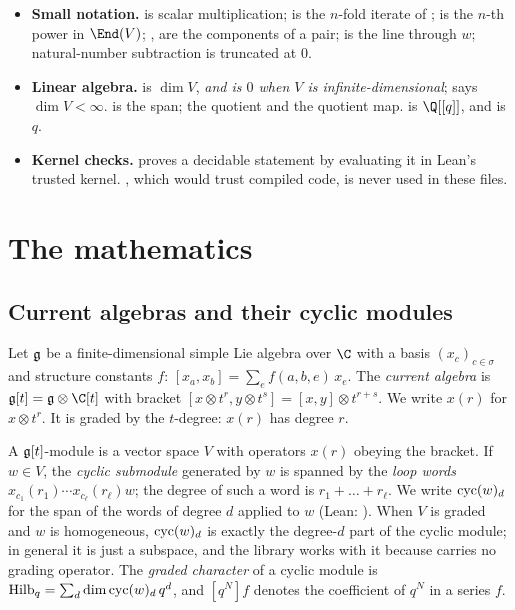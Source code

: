 \begin{itemize}
  $=\{0,\dots,n-1\}$;  $=\{(i,j):i+j=n\}$.
\item \textbf{Small notation.}  is scalar multiplication;  is the $n$-fold iterate of ;
   is the $n$-th power in $\End(V)$; ,  are the components of a pair;  is
  the line through $w$; natural-number subtraction is truncated at $0$.
\item \textbf{Linear algebra.}  is $\dim V$, \emph{and is $0$ when $V$ is infinite-dimensional};
   says $\dim V<\infty$.  is the span;  the quotient and
   the quotient map.  is $\Q[[q]]$, and  is $q$.
\item \textbf{Kernel checks.}  proves a decidable statement by evaluating it in Lean's trusted kernel.
  , which would trust compiled code, is never used in these files.
\end{itemize}

\section{The mathematics}\label{l26:sec:math}

\subsection{Current algebras and their cyclic modules}\label{l26:sec:current}

Let $\mathfrak g$ be a finite-dimensional simple Lie algebra over $\C$ with a basis $(x_c)_{c\in\sigma}$ and
structure constants $f$: $[x_a,x_b]=\sum_e f(a,b,e)\,x_e$. The \emph{current algebra} is
$\ltwentysixgt=\ltwentysixg\otimes\C[t]$ with bracket $[x\otimes t^r,y\otimes t^s]=[x,y]\otimes t^{r+s}$. We write
$x(r)$ for $x\otimes t^r$. It is graded by the $t$-degree: $x(r)$ has degree $r$.

A $\mathfrak g[t]$-module is a vector space $V$ with operators $x(r)$ obeying the bracket. If $w\in V$, the
\emph{cyclic submodule} generated by $w$ is spanned by the \emph{loop words} $x_{c_1}(r_1)\cdots x_{c_\ell}(r_\ell)w$;
the degree of such a word is $r_1+\dots+r_\ell$. We write $\operatorname{cyc}(w)_d$ for the span of the words of degree
$d$ applied to $w$ (Lean: ). When $V$ is graded and $w$ is homogeneous, $\operatorname{cyc}(w)_d$ is
exactly the degree-$d$ part of the cyclic module; in general it is just a subspace, and the library works with it
because  carries no grading operator. The \emph{graded character} of a cyclic module is
$\operatorname{Hilb}_q=\sum_d\dim\operatorname{cyc}(w)_d\,q^d$, and $[q^N]f$ denotes the coefficient of $q^N$ in a series $f$.

